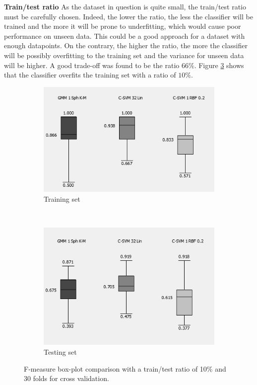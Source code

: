 \documentclass[a4paper,10pt]{article}
\begin{document}
\label{sec:classifier_robustness}

\textbf{Train/test ratio}
As the dataset in question is quite small, the train/test ratio must be carefully chosen. Indeed, the lower the ratio, the less the classifier will be trained and the more it will be prone to underfitting, which would cause poor performance on unseen data. This could be a good approach for a dataset with enough datapoints. On the contrary, the higher the ratio, the more the classifier will be possibly overfitting to the training set and the variance for unseen data will be higher. A good trade-off was found to be the ratio $66\%$. Figure \ref{fig:robustness-train-ratio} shows that the classifier overfits the training set with a ratio of $10\%$.

\begin{figure}[H]
\centering
	\begin{subfigure}[t]{0.3\textwidth} 
      \centering
      \includegraphics[height=3.2 cm]{pictures/train-test-ratio-low-10percent-train-data}
      \caption{Training set}
      \label{fig:train-test-ratio-low-10percent-train-data}
    \end{subfigure}%
    ~
    \begin{subfigure}[t]{0.3\textwidth} 
      \centering
      \includegraphics[height=3.2 cm]{pictures/train-test-ratio-low-10percent-test-data}
      \caption{Testing set}
      \label{fig:train-test-ratio-low-10percent-train-data}
     \end{subfigure}

     \caption{F-measure box-plot comparison with a train/test ratio of 10\% and 30 folds for cross validation.}
     \label{fig:robustness-train-ratio}
\end{figure}
\end{document}
